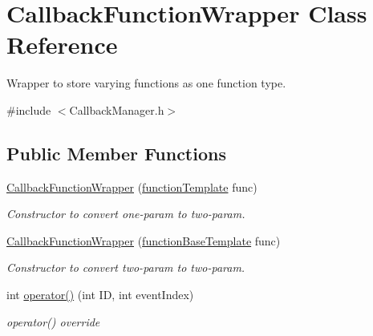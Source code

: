 \hypertarget{class_callback_function_wrapper}{\section{Callback\-Function\-Wrapper Class Reference}
\label{d6/dca/class_callback_function_wrapper}
}


Wrapper to store varying functions as one function type.  




{\ttfamily \#include $<$Callback\-Manager.\-h$>$}

\subsection*{Public Member Functions}
\begin{DoxyCompactItemize}
\item 
\hypertarget{class_callback_function_wrapper_af8d8ef7b676450baa1c3c14a536d0460}{\hyperlink{class_callback_function_wrapper_af8d8ef7b676450baa1c3c14a536d0460}{Callback\-Function\-Wrapper} (\hyperlink{_callback_manager_8h_a73a0c6254a0b5ab661ca1f3bd5f3d99c}{function\-Template} func)}\label{d6/dca/class_callback_function_wrapper_af8d8ef7b676450baa1c3c14a536d0460}

\begin{DoxyCompactList}\small\item\em Constructor to convert one-\/param to two-\/param. \end{DoxyCompactList}\item 
\hypertarget{class_callback_function_wrapper_ae257988a69ea0f507b75fcc9b7d61f75}{\hyperlink{class_callback_function_wrapper_ae257988a69ea0f507b75fcc9b7d61f75}{Callback\-Function\-Wrapper} (\hyperlink{_callback_manager_8h_afb6653b2315b76a8dcbae52ed1be8b8f}{function\-Base\-Template} func)}\label{d6/dca/class_callback_function_wrapper_ae257988a69ea0f507b75fcc9b7d61f75}

\begin{DoxyCompactList}\small\item\em Constructor to convert two-\/param to two-\/param. \end{DoxyCompactList}\item 
int \hyperlink{class_callback_function_wrapper_a0fecf948ee0fa6e55ce77b0b5bb352b4}{operator()} (int I\-D, int event\-Index)
\begin{DoxyCompactList}\small\item\em operator() override \end{DoxyCompactList}\end{DoxyCompactItemize}


